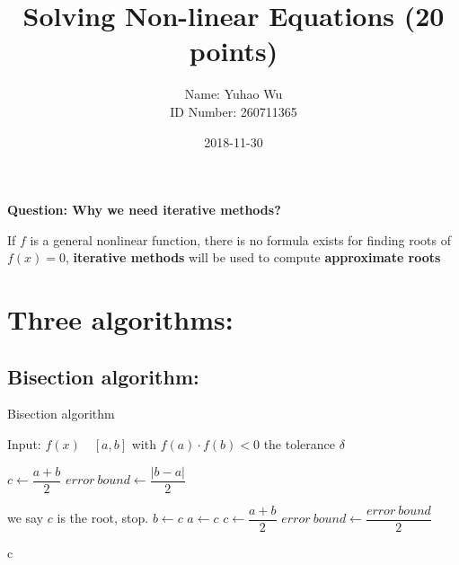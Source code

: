 \documentclass [9 pt]{article}
\theoremstyle{definition}
\begin{document}
\title{Solving Non-linear Equations (20 points)}
\date{2018-11-30}
\author{Name: Yuhao Wu\\
ID Number: 260711365
}
\maketitle

\textbf{Question: Why we need iterative methods?}
\begin{mdframed}
	If $f$ is a general nonlinear function, there is no formula exists for finding roots of $f(x) = 0$, \textbf{iterative methods } will be used to compute \textbf{ approximate roots }
\end{mdframed}


\section*{Three algorithms:}

\subsection*{Bisection algorithm:}

\begin{algorithm}
\caption{Bisection algorithm}
\begin{algorithmic}[1]
\State Input: $f(x)\quad [a, b]$ with $f(a) \cdot f(b)<0$ \quad the tolerance $\delta$

	\State $c \gets \dfrac{a + b}{2}$ 
	\State $error\ bound  \gets  \dfrac{|b - a|}{2} $ 
	
			\State we say $c$ is the root, stop.
			\Else
					\State $b \gets c$ 
					\Else
					\State $a \gets c$
				\EndIf	
		\EndIf
		\State $c \gets \dfrac{a + b}{2}$
		\State $error\ bound \gets \dfrac{error\ bound}{2}$
		
	\EndWhile
	
	\State \Return c


\end{algorithmic}
\end{algorithm}


\newpage
\end{document}
